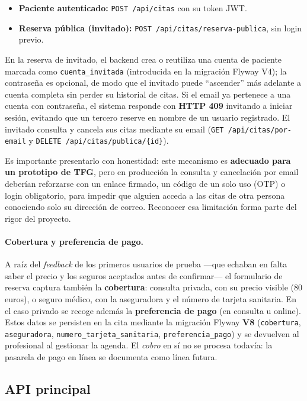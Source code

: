 \documentclass[12pt,a4paper]{report}
\begin{document}
\begin{itemize}
  \item \textbf{Paciente autenticado:} \texttt{POST /api/citas} con su token JWT.
  \item \textbf{Reserva pública (invitado):} \texttt{POST /api/citas/reserva-publica}, sin login previo.
\end{itemize}

En la reserva de invitado, el backend crea o reutiliza una cuenta de paciente marcada como \texttt{cuenta\_invitada} (introducida en la migración Flyway V4); la contraseña es opcional, de modo que el invitado puede ``ascender'' más adelante a cuenta completa sin perder su historial de citas. Si el email ya pertenece a una cuenta con contraseña, el sistema responde con \textbf{HTTP 409} invitando a iniciar sesión, evitando que un tercero reserve en nombre de un usuario registrado. El invitado consulta y cancela sus citas mediante su email (\texttt{GET /api/citas/por-email} y \texttt{DELETE /api/citas/publica/\{id\}}).

Es importante presentarlo con honestidad: este mecanismo es \textbf{adecuado para un prototipo de TFG}, pero en producción la consulta y cancelación por email deberían reforzarse con un enlace firmado, un código de un solo uso (OTP) o login obligatorio, para impedir que alguien acceda a las citas de otra persona conociendo solo su dirección de correo. Reconocer esa limitación forma parte del rigor del proyecto.

\paragraph{Cobertura y preferencia de pago.} A raíz del \emph{feedback} de los primeros usuarios de prueba —que echaban en falta saber el precio y los seguros aceptados antes de confirmar— el formulario de reserva captura también la \textbf{cobertura}: consulta privada, con su precio visible (80 euros), o seguro médico, con la aseguradora y el número de tarjeta sanitaria. En el caso privado se recoge además la \textbf{preferencia de pago} (en consulta u online). Estos datos se persisten en la cita mediante la migración Flyway \textbf{V8} (\texttt{cobertura}, \texttt{aseguradora}, \texttt{numero\_tarjeta\_sanitaria}, \texttt{preferencia\_pago}) y se devuelven al profesional al gestionar la agenda. El \emph{cobro} en sí no se procesa todavía: la pasarela de pago en línea se documenta como línea futura.

\subsection{API principal}
\end{document}
